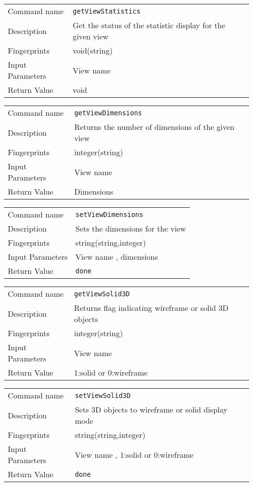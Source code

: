 \noindent
\begin{tabular}{l|p{5in}}
\hline
Command name &{\tt getViewStatistics }\\ 
Description &
 Get the status of the statistic display for the given view 
 	\\
Fingerprints & void(string)\\
Input Parameters& View name \\
Return Value&void\\
\hline
\end{tabular}
\bigskip

\noindent
\begin{tabular}{l|p{5in}}
\hline
Command name &{\tt getViewDimensions }\\ 
Description &
 Returns the number of dimensions of the given view 
 	\\
Fingerprints & integer(string)\\
Input Parameters& View name \\
Return Value& Dimensions \\
\hline
\end{tabular}
\bigskip

\noindent
\begin{tabular}{l|p{5in}}
\hline
Command name &{\tt setViewDimensions }\\ 
Description &
 Sets the dimensions for the view 
 	\\
Fingerprints & string(string,integer)\\
Input Parameters& View name , dimensions \\
Return Value&{\tt done}\\
\hline
\end{tabular}
\bigskip

\noindent
\begin{tabular}{l|p{5in}}
\hline
Command name &{\tt getViewSolid3D }\\ 
Description &
 Returns flag indicating wireframe or solid 3D objects 
 	\\
Fingerprints & integer(string)\\
Input Parameters& View name \\
Return Value& 1:solid or 0:wireframe \\
\hline
\end{tabular}
\bigskip

\noindent
\begin{tabular}{l|p{5in}}
\hline
Command name &{\tt setViewSolid3D }\\ 
Description &
 Sets 3D objects to wireframe or solid display mode 
 	\\
Fingerprints & string(string,integer)\\
Input Parameters& View name , 1:solid or 0:wireframe\\
Return Value&{\tt done}\\
\hline
\end{tabular}
\bigskip


